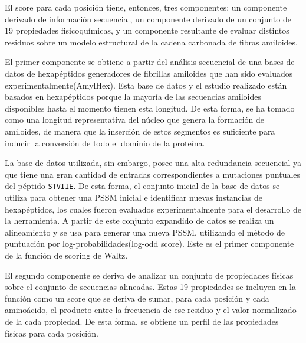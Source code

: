 

El score para cada posición tiene, entonces, tres componentes: un componente derivado de información secuencial, un componente derivado de un conjunto de 19 propiedades fisicoquímicas, 
y un componente resultante de evaluar distintos residuos sobre un modelo estructural de la cadena carbonada de fibras amiloides.

El primer componente se obtiene a partir del análisis secuencial de una bases de datos de hexapéptidos generadores de fibrillas amiloides que han sido evaluados experimentalmente(AmylHex).
Esta base de datos y el estudio realizado están basados en hexapéptidos porque la mayoría de las secuencias amiloides disponibles hasta el momento tienen esta longitud.
De esta forma, se ha tomado como una longitud representativa del núcleo que genera la formación de amiloides, de manera que
la inserción de estos segmentos es suficiente para inducir la conversión de todo el dominio de la proteína. 

La base de datos utilizada, sin embargo, posee una alta redundancia secuencial ya que tiene una gran cantidad de entradas correspondientes a mutaciones puntuales del péptido \texttt{STVIIE}.
De esta forma, el conjunto inicial de la base de datos se utiliza para obtener una PSSM inicial e identificar nuevas instancias de hexapéptidos, los cuales fueron evaluados experimentalmente para el desarrollo de la herramienta.
A partir de este conjunto expandido de datos se realiza un alineamiento y se usa para generar una nueva PSSM, utilizando el método de puntuación por log-probabilidades(log-odd score).
Este es el primer componente de la función de scoring de Waltz.

El segundo componente se deriva de analizar un conjunto de propiedades físicas sobre el conjunto de secuencias alineadas.
Estas 19 propiedades se incluyen en la función como un score que se deriva de sumar, para cada posición y cada aminoácido, el producto entre la frecuencia de ese residuo
y el valor normalizado de la cada propiedad. De esta forma, se obtiene un perfil de las propiedades físicas para cada posición.


